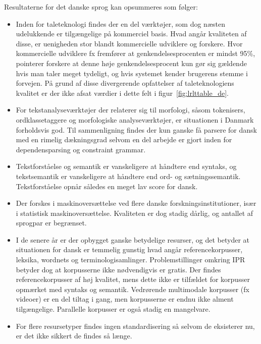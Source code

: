 \begin{multicols}{2}
Resultaterne for det danske sprog kan opsummeres som f\o lger:
 \begin{itemize}
      \item Inden for taleteknologi findes der en del v\ae rkt\o jer, som dog n\ae sten udelukkende er tilg\ae ngelige \mbox{p\aa} kommerciel basis. Hvad ang\aa r kvaliteten af disse, er uenigheden stor blandt kommercielle udviklere og forskere. Hvor kommercielle udviklere fx fremf\o rer at genkendelsesprocenten er mindst 95\%, poin\-terer forskere at denne h\o je genkendelsesprocent kun g\o r sig g\ae ldende hvis man taler meget tydeligt, og hvis systemet kender brugerens stemme i forvejen. \mbox{P\aa} grund af disse divergerende opfattelser af taletek\-nologiens kvalitet er der ikke afsat v\ae rdier i dette felt i figur~\ref{fig:lrlttable_de}.
\item For tekstanalysev\ae rkt\o jer der relaterer sig til morfologi, \mbox{s\aa}som tokenisers, ordklassetaggere og morfo\-logiske analysev\ae rkt\o jer, er situationen i Danmark forholdsvis god. Til sammenligning findes der kun ganske \mbox{f\aa} parsere for dansk med en rimelig d\ae kningsgrad selvom en del arbejde er gjort inden for dependensparsing og constraint grammar.
\item \sloppy Tekstforst\aa else og semantik er vanskeligere at h\aa ndtere end syntaks, og tekstsemantik er vanskeligere at h\aa ndtere end ord- og s\ae tningssemantik. Tekstforst\aa else opn\aa r s\aa ledes en meget lav score for dansk. 
\item Der forskes i maskinovers\ae ttelse ved flere danske forskningsinstitutioner, is\ae r i statistisk maskinovers\ae ttelse. Kvaliteten er dog stadig d\aa rlig, og antallet af sprogpar er begr\ae nset. 
\item I de senere \aa r er der opbygget ganske betydelige resurser, og det betyder at situationen for dansk er temmelig gunstig hvad ang\aa r referencekorpusser, leksika, wordnets og terminologisamlinger. Pro\-blemstillinger omkring IPR betyder dog at korpusserne ikke n\o dvendigvis er gratis. Der findes referencekorpusser af h\o j kvalitet, mens dette ikke er tilf\ae ldet for korpusser opm\ae rket med syntaks og semantik. Vedr\o rende multimodale korpusser (fx videoer) er en del tiltag i gang, men korpusserne er endnu ikke alment tilg\ae ngelige. Parallelle korpusser er \mbox{ogs\aa} stadig en mangelvare. 
\item For flere resursetyper findes ingen standardisering \mbox{s\aa} selvom de eksisterer nu, er det ikke sikkert de findes \mbox{s\aa} l\ae nge.

\end{itemize}
\end{multicols}
